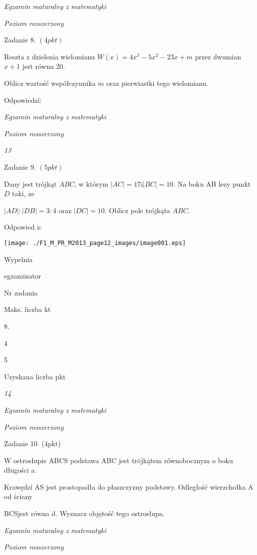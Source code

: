 \documentclass[a4paper,12pt]{article}
\begin{document}
{\it Egzamin maturalny z matematyki}

{\it Poziom rozszerzony}

Zadanie 8. $(4pkt)$

Reszta z dzielenia wielomianu $W(x)=4x^{3}-5x^{2}-23x+m$ przez dwumian $x+1$ jest równa 20.

Oblicz wartość współczynnika $m$ oraz pierwiastki tego wielomianu.

Odpowiedzí:





{\it Egzamin maturalny z matematyki}

{\it Poziom rozszerzony}

{\it 13}

Zadanie 9. $(5pkt)$

Dany jest trójkąt $ABC$, w którym $|AC|=17 \mathrm{i} |BC|=10$. Na boku AB lezy punkt $D$ taki, $\dot{\mathrm{z}}\mathrm{e}$

$|AD|:|DB|=3:4$ oraz $|DC|=10$. Oblicz pole trójkąta $ABC.$

Odpowied $\acute{\mathrm{z}}$:
\begin{center}
\texttt{[image: ./F1\_M\_PR\_M2013\_page12\_images/image001.eps]}
\end{center}
Wypelnia

egzaminator

Nr zadania

Maks. liczba kt

8.

4

5

Uzyskana liczba pkt





{\it 14}

{\it Egzamin maturalny z matematyki}

{\it Poziom rozszerzony}

Zadanie 10. (4pkt)

W ostrosłupie ABCS podstawa ABC jest trójkątem równobocznym o boku długości a.

Krawędzí AS jest prostopadła do płaszczyzny podstawy. Odległość wierzchołka A od ściany

BCSjest równa d. Wyznacz objętość tego ostrosłupa.





{\it Egzamin maturalny z matematyki}

{\it Poziom rozszerzony}
\end{document}
